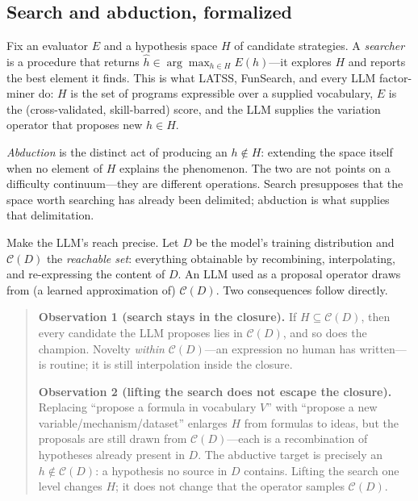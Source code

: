 
\subsection{Search and abduction, formalized}
\label{sec:formal}

Fix an evaluator $E$ and a hypothesis space $H$ of candidate strategies. A \emph{searcher} is a
procedure that returns $\hat h \in \arg\max_{h \in H} E(h)$---it explores $H$ and reports the
best element it finds. This is what LATSS, FunSearch, and every LLM factor-miner do: $H$ is the
set of programs expressible over a supplied vocabulary, $E$ is the (cross-validated, skill-barred)
score, and the LLM supplies the variation operator that proposes new $h \in H$.

\emph{Abduction} is the distinct act of producing an $h \notin H$: extending the space itself when
no element of $H$ explains the phenomenon. The two are not points on a difficulty continuum---they
are different operations. Search presupposes that the space worth searching has already been
delimited; abduction is what supplies that delimitation.

Make the LLM's reach precise. Let $D$ be the model's training distribution and $\mathcal{C}(D)$ the
\emph{reachable set}: everything obtainable by recombining, interpolating, and re-expressing the
content of $D$. An LLM used as a proposal operator draws from (a learned approximation of)
$\mathcal{C}(D)$. Two consequences follow directly.

\begin{quote}
\textbf{Observation 1 (search stays in the closure).} If $H \subseteq \mathcal{C}(D)$, then every
candidate the LLM proposes lies in $\mathcal{C}(D)$, and so does the champion. Novelty
\emph{within} $\mathcal{C}(D)$---an expression no human has written---is routine; it is still
interpolation inside the closure.

\textbf{Observation 2 (lifting the search does not escape the closure).} Replacing ``propose a
formula in vocabulary $V$'' with ``propose a new variable/mechanism/dataset'' enlarges $H$ from
formulas to ideas, but the proposals are still drawn from $\mathcal{C}(D)$---each is a
recombination of hypotheses already present in $D$. The abductive target is precisely an $h \notin
\mathcal{C}(D)$: a hypothesis no source in $D$ contains. Lifting the search one level changes $H$;
it does not change that the operator samples $\mathcal{C}(D)$.
\end{quote}

